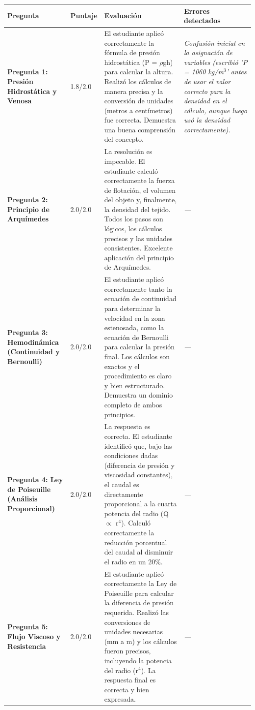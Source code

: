 \documentclass[11pt,a4paper]{article}
\begin{document}
\begin{longtable}{>{\bfseries}p{2.8cm} p{1.6cm} p{7.0cm} p{2.8cm}}
  \toprule
  \textbf{Pregunta} & \textbf{Puntaje} & \textbf{Evaluación} & \textbf{Errores detectados} \\
  \midrule
  \endhead
  \bottomrule
  \endfoot
    \textbf{Pregunta 1: Presión Hidrostática y Venosa} & 1.8/2.0 & El estudiante aplicó correctamente la fórmula de presión hidrostática (P = $\rho$gh) para calcular la altura. Realizó los cálculos de manera precisa y la conversión de unidades (metros a centímetros) fue correcta. Demuestra una buena comprensión del concepto. & \textit{Confusión inicial en la asignación de variables (escribió 'P = 1060 kg/m$^{3}$' antes de usar el valor correcto para la densidad en el cálculo, aunque luego usó la densidad correctamente).} \\
    \midrule
    \textbf{Pregunta 2: Principio de Arquímedes} & 2.0/2.0 & La resolución es impecable. El estudiante calculó correctamente la fuerza de flotación, el volumen del objeto y, finalmente, la densidad del tejido. Todos los pasos son lógicos, los cálculos precisos y las unidades consistentes. Excelente aplicación del principio de Arquímedes. & \textit{---} \\
    \midrule
    \textbf{Pregunta 3: Hemodinámica (Continuidad y Bernoulli)} & 2.0/2.0 & El estudiante aplicó correctamente tanto la ecuación de continuidad para determinar la velocidad en la zona estenosada, como la ecuación de Bernoulli para calcular la presión final. Los cálculos son exactos y el procedimiento es claro y bien estructurado. Demuestra un dominio completo de ambos principios. & \textit{---} \\
    \midrule
    \textbf{Pregunta 4: Ley de Poiseuille (Análisis Proporcional)} & 2.0/2.0 & La respuesta es correcta. El estudiante identificó que, bajo las condiciones dadas (diferencia de presión y viscosidad constantes), el caudal es directamente proporcional a la cuarta potencia del radio (Q $\propto$ r$^{4}$). Calculó correctamente la reducción porcentual del caudal al disminuir el radio en un 20\%. & \textit{---} \\
    \midrule
    \textbf{Pregunta 5: Flujo Viscoso y Resistencia} & 2.0/2.0 & El estudiante aplicó correctamente la Ley de Poiseuille para calcular la diferencia de presión requerida. Realizó las conversiones de unidades necesarias (mm a m) y los cálculos fueron precisos, incluyendo la potencia del radio (r$^{4}$). La respuesta final es correcta y bien expresada. & \textit{---} \\
    \midrule
\end{longtable}
\end{document}
